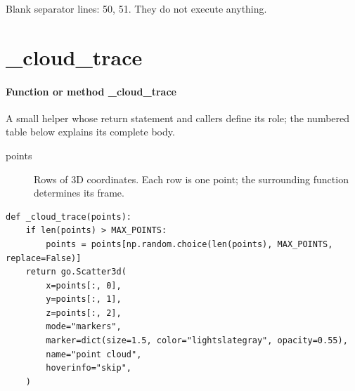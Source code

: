 \documentclass[11pt,a4paper]{book}
\begin{document}
Blank separator lines: 50, 51. They do not execute anything.

\section{\_cloud\_trace}

\paragraph{Function or method \_cloud\_trace}
A small helper whose return statement and callers define its role; the numbered table below explains its complete body.

\begin{description}
\item[points] Rows of 3D coordinates. Each row is one point; the surrounding function determines its frame.
\end{description}

\begin{lstlisting}[firstnumber=52]
def _cloud_trace(points):
    if len(points) > MAX_POINTS:
        points = points[np.random.choice(len(points), MAX_POINTS, replace=False)]
    return go.Scatter3d(
        x=points[:, 0],
        y=points[:, 1],
        z=points[:, 2],
        mode="markers",
        marker=dict(size=1.5, color="lightslategray", opacity=0.55),
        name="point cloud",
        hoverinfo="skip",
    )


\end{lstlisting}
\end{document}
